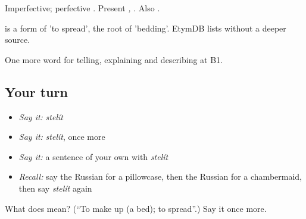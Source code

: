 Imperfective; perfective \emph{}. Present \emph{, }. Also \emph{}.

\begin{cousinweb}
\emph{} is a form of \emph{} 'to spread', the root of \emph{} 'bedding'. EtymDB lists \emph{} without a deeper source.
\end{cousinweb}

\begin{grammarlens}[title={What you've built}]
One more word for telling, explaining and describing at B1.
\end{grammarlens}

\subsection*{Your turn}
\begin{itemize}
\raggedright
  \item \emph{Say it:} \emph{stelít}
  \item \emph{Say it:} \emph{stelít}, once more
  \item \emph{Say it:} a sentence of your own with \emph{stelít}
  \item \emph{Recall:} say the Russian for a pillowcase, then the Russian for a chambermaid, then say \emph{stelít} again
\end{itemize}

\begin{tcolorbox}[breakable,colback=teal!4,colframe=teal!35!black,title={Before you move on}]
What does  mean? (\textquotedblleft{}To make up (a bed); to spread\textquotedblright{}.) Say it once more.
\end{tcolorbox}
